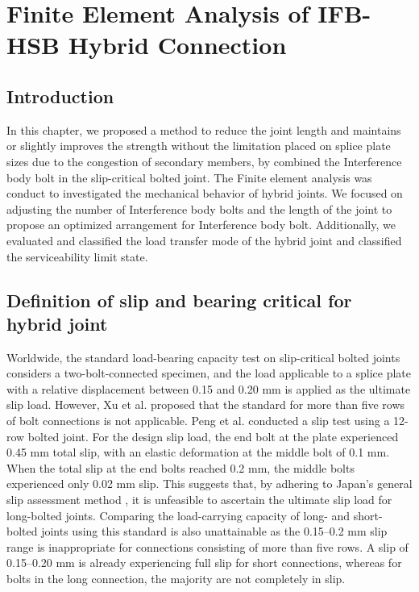 \chapter{Finite Element Analysis of IFB-HSB Hybrid Connection}
\label{ch5}

\begin{spacing}{1.25} %
\minitoc %
\end{spacing} %
\onehalfspacing %

\section{Introduction}


In this chapter, we proposed a method to reduce the joint length and maintains or slightly improves the strength without the limitation placed on splice plate sizes due to the congestion of secondary members, by combined the Interference body bolt in the slip-critical bolted joint. The Finite element analysis was conduct to investigated the mechanical behavior of hybrid joints. We focused on adjusting the number of Interference body bolts and the length of the joint to propose an optimized arrangement for Interference body bolt. Additionally, we evaluated and classified the load transfer mode of the hybrid joint and classified the serviceability limit state.


\section{Definition of slip and bearing critical for hybrid joint}

Worldwide, the standard load-bearing capacity test on slip-critical bolted joints considers a two-bolt-connected specimen, and the load applicable to a splice plate with a relative displacement between 0.15 and 0.20 mm is applied as the ultimate slip load. However, Xu et al.\cite{xu2011} proposed that the standard for more than five rows of bolt connections is not applicable.  Peng et al.\cite{Peng2013} conducted a slip test using a 12-row bolted joint. For the design slip load, the end bolt at the plate experienced 0.45 mm total slip, with an elastic deformation at the middle bolt of 0.1 mm. When the total slip at the end bolts reached 0.2 mm, the middle bolts experienced only 0.02 mm slip. This suggests that, by adhering to Japan's general slip assessment method \cite{AIJ2012AIJStructures}, it is unfeasible to ascertain the ultimate slip load for long-bolted joints. Comparing the load-carrying capacity of long- and short-bolted joints using this standard is also unattainable as the 0.15--0.2 mm slip range is inappropriate for connections consisting of more than five rows. A slip of 0.15--0.20 mm is already experiencing full slip for short connections, whereas for bolts in the long connection, the majority are not completely in slip. \par

